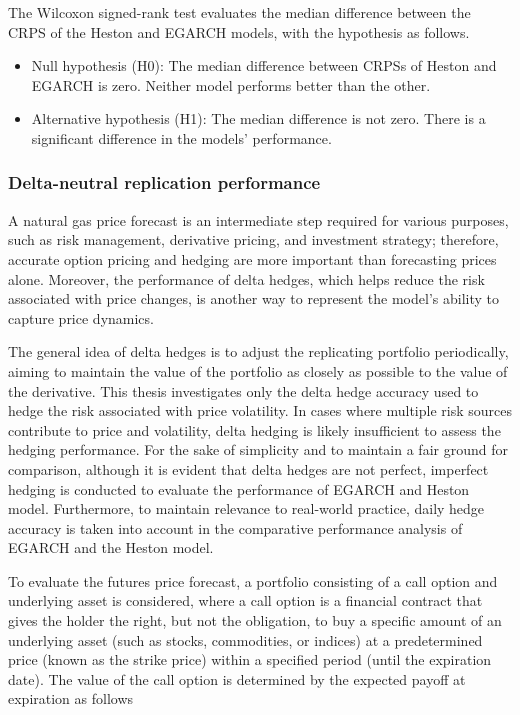 \documentclass[12pt,a4paper]{article}
\numberwithin{equation}{section}
\begin{document}
The Wilcoxon signed-rank test evaluates the median difference between the CRPS of the Heston and EGARCH models, with the hypothesis as follows.

\begin{itemize}
\item Null hypothesis (H0): The median difference between CRPSs of Heston and EGARCH is zero. Neither model performs better than the other.

\item Alternative hypothesis (H1): The median difference is not zero. There is a significant difference in the models' performance.
\end{itemize}

\subsubsection{Delta-neutral replication performance}

A natural gas price forecast is an intermediate step required for various purposes, such as risk management, derivative pricing, and investment strategy; therefore, accurate option pricing and hedging are more important than forecasting prices alone. Moreover, the performance of delta hedges, which helps reduce the risk associated with price changes, is another way to represent the model's ability to capture price dynamics.

The general idea of delta hedges is to adjust the replicating portfolio periodically, aiming to maintain the value of the portfolio as closely as possible to the value of the derivative. This thesis investigates only the delta hedge accuracy used to hedge the risk associated with price volatility. In cases where multiple risk sources contribute to price and volatility, delta hedging is likely insufficient to assess the hedging performance. For the sake of simplicity and to maintain a fair ground for comparison, although it is evident that delta hedges are not perfect, imperfect hedging is conducted to evaluate the performance of EGARCH and Heston model. Furthermore, to maintain relevance to real-world practice, daily hedge accuracy is taken into account in the comparative performance analysis of EGARCH and the Heston model.

To evaluate the futures price forecast, a portfolio consisting of a call option and underlying asset is considered, where a call option is a financial contract that gives the holder the right, but not the obligation, to buy a specific amount of an underlying asset (such as stocks, commodities, or indices) at a predetermined price (known as the strike price) within a specified period (until the expiration date). The value of the call option is determined by the expected payoff at expiration as follows
\end{document}
